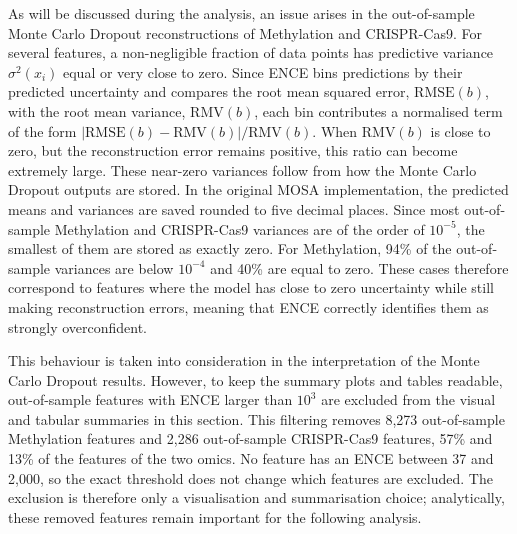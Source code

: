 As will be discussed during the analysis, an issue arises in the out-of-sample Monte Carlo Dropout reconstructions of Methylation and CRISPR-Cas9. For several features, a non-negligible fraction of data points has predictive variance \(\sigma^2(x_i)\) equal or very close to zero. Since ENCE bins predictions by their predicted uncertainty and compares the root mean squared error, \(\mathrm{RMSE}(b)\), with the root mean variance, \(\mathrm{RMV}(b)\), each bin contributes a normalised term of the form \(|\mathrm{RMSE}(b)-\mathrm{RMV}(b)|/\mathrm{RMV}(b)\). When \(\mathrm{RMV}(b)\) is close to zero, but the reconstruction error remains positive, this ratio can become extremely large. These near-zero variances follow from how the Monte Carlo Dropout outputs are stored. In the original MOSA implementation, the predicted means and variances are saved rounded to five decimal places. Since most out-of-sample Methylation and CRISPR-Cas9 variances are of the order of $10^{-5}$, the smallest of them are stored as exactly zero. For Methylation, 94\% of the out-of-sample variances are below $10^{-4}$ and 40\% are equal to zero. These cases therefore correspond to features where the model has close to zero uncertainty while still making reconstruction errors, meaning that ENCE correctly identifies them as strongly overconfident.

This behaviour is taken into consideration in the interpretation of the Monte Carlo Dropout results. However, to keep the summary plots and tables readable, out-of-sample features with ENCE larger than \(10^3\) are excluded from the visual and tabular summaries in this section. This filtering removes 8,273 out-of-sample Methylation features and 2,286 out-of-sample CRISPR-Cas9 features, 57\% and 13\% of the features of the two omics. No feature has an ENCE between 37 and 2,000, so the exact threshold does not change which features are excluded. The exclusion is therefore only a visualisation and summarisation choice; analytically, these removed features remain important for the following analysis.



